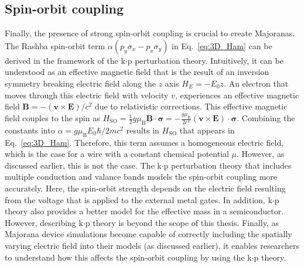 \subsection{Spin-orbit coupling}
Finally, the presence of strong spin-orbit coupling is crucial to create Majoranas.
The Rashba spin-orbit term $\alpha\left(p_{y}\sigma_{x}-p_{x}\sigma_{y}\right)$ in Eq.~\eqref{eq:3D_Ham} can be derived in the framework of the k$\cdot$p perturbation theory.
Intuitively, it can be understood as an effective magnetic field that is the result of an inversion symmetry breaking electric field along the $z$ axis $H_E=-E_0 z$.
An electron that moves through this electric field with velocity $v$, experiences an effective magnetic field $\bm{B} =-(\bm{v} \times \bm{E} )/c^{2}$ due to relativistic corrections.
This effective magnetic field couples to the spin as $H_\textrm{SO} = \frac{1}{2} g \mu_\textrm{B} \bm{B} \cdot \bm{\sigma} = -\frac{g \mu_\textrm{B}}{2c^2} (\bm{v} \times \bm{E}) \cdot \bm{\sigma}$.
Combining the constants into $\alpha = g \mu_\textrm{B} E_0 \hbar / 2 m c^2$ results in $H_\textrm{SO}$ that appears in Eq.~\eqref{eq:3D_Ham}.
Therefore, this term assumes a homogeneous electric field, which is the case for a wire with a constant chemical potential $\mu$.
However, as discussed earlier, this is not the case.
The k$\cdot$p perturbation theory that includes multiple conduction and valance bands models the spin-orbit coupling more accurately.
Here, the spin-orbit strength depends on the electric field resulting from the voltage that is applied to the external metal gates.
In addition, k$\cdot$p theory also provides a better model for the effective mass in a semiconductor.
However, describing k$\cdot$p theory is beyond the scope of this thesis.
Finally, as Majorana device simulations become capable of correctly including the spatially varying electric field into their models (as discussed earlier), it enables researchers to understand how this affects the spin-orbit coupling by using the k$\cdot$p theory.




